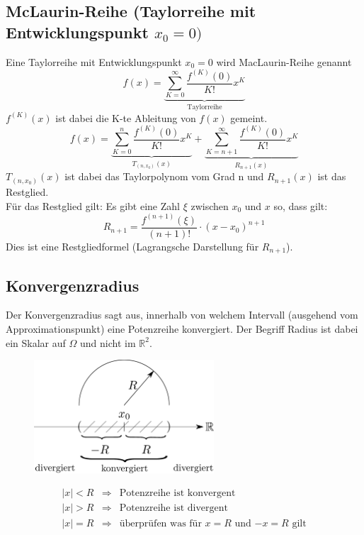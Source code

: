 \subsection{McLaurin-Reihe (Taylorreihe mit Entwicklungspunkt $x_0 = 0)$}
Eine Taylorreihe mit Entwicklungspunkt $x_0 = 0$ wird MacLaurin-Reihe genannt
\[ \boxed{f(x) = \underbrace{\sum_{K=0}^{\infty}
\frac{f^{(K)}(0)}{K!} x^K}_{\text{Taylorreihe}}} \]
$f^{(K)}(x)$ ist dabei die K-te Ableitung von $f(x)$ gemeint. 
\[ \boxed{f(x) = \underbrace{\sum_{K=0}^{n}
\frac{f^{(K)}(0)}{K!} x^K}_{T_{(n,x_0)}(x)} + 
\underbrace{\sum_{K=n+1}^{\infty}\frac{f^{(K)}(0)}{K!} x^K}_{R_{n+1}(x)}} \]
$T_{(n,x_0)}(x)$ ist dabei das Taylorpolynom vom Grad n und $R_{n+1}(x)$ ist 
das Restglied. \\
Für das Restglied gilt: Es gibt eine Zahl $\xi$ zwischen $x_0$ und $x$ so, dass 
gilt:
\[ \boxed{R_{n+1} = \frac{f^{(n + 1)}(\xi)}{(n + 1)!} \cdot (x - x_0)^{n + 1}}\]
Dies ist eine Restgliedformel (Lagrangsche Darstellung für $R_{n + 1}$).

\subsection{Konvergenzradius}
Der Konvergenzradius sagt aus, innerhalb von welchem Intervall (ausgehend vom 
Approximationspunkt)
eine Potenzreihe konvergiert. Der Begriff Radius ist dabei ein Skalar auf 
$\Omega$ und nicht im $\mathbb{R}^2$.

\begin{figure}[h!]
\centering
\includegraphics[width=0.6\textwidth]{../fig/konvergenzradius.pdf}
\end{figure}

\[ \boxed{ \begin{array}{lll} 
    |x| < R & \Rightarrow & \text{Potenzreihe ist konvergent} \\
    |x| > R & \Rightarrow & \text{Potenzreihe ist divergent} \\
    |x| = R & \Rightarrow & \text{überprüfen was für $x=R$ und $-x=R$ gilt}
\end{array} } \]

